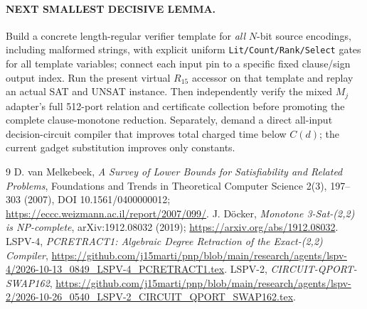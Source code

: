 \documentclass[11pt]{article}
\begin{document}
\paragraph{NEXT SMALLEST DECISIVE LEMMA.} Build a concrete length-regular verifier template for \emph{all} $N$-bit source encodings, including malformed strings, with explicit uniform \texttt{Lit/Count/Rank/Select} gates for all template variables; connect each input pin to a specific fixed clause/sign output index. Run the present virtual $R_{15}$ accessor on that template and replay an actual SAT and UNSAT instance. Then independently verify the mixed $M_j$ adapter's full 512-port relation and certificate collection before promoting the complete clause-monotone reduction. Separately, demand a direct all-input decision-circuit compiler that improves total charged time below $C(d)$; the current gadget substitution improves only constants.

\begin{thebibliography}{9}
 D. van Melkebeek, \emph{A Survey of Lower Bounds for Satisfiability and Related Problems}, Foundations and Trends in Theoretical Computer Science 2(3), 197--303 (2007), DOI 10.1561/0400000012; \url{https://eccc.weizmann.ac.il/report/2007/099/}.
 J. D\"ocker, \emph{Monotone 3-Sat-(2,2) is NP-complete}, arXiv:1912.08032 (2019); \url{https://arxiv.org/abs/1912.08032}.
 LSPV-4, \emph{PCRETRACT1: Algebraic Degree Retraction of the Exact-(2,2) Compiler}, \url{https://github.com/j15marti/pnp/blob/main/research/agents/lspv-4/2026-10-13_0849_LSPV-4_PCRETRACT1.tex}.
 LSPV-2, \emph{CIRCUIT-QPORT-SWAP162}, \url{https://github.com/j15marti/pnp/blob/main/research/agents/lspv-2/2026-10-26_0540_LSPV-2_CIRCUIT_QPORT_SWAP162.tex}.
\end{thebibliography}
\end{document}
